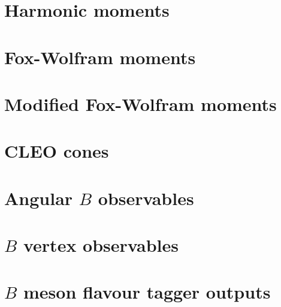 \section{Harmonic moments}\label{sec:harmonic_moments}

\newpage

\section{Fox-Wolfram moments}\label{sec:fox_wolfram_moments}

\newpage

\section{Modified Fox-Wolfram moments}\label{sec:modified_fox_wolfram_moments}

\newpage

\section{CLEO cones}\label{sec:cleo_cones}

\newpage

\section{Angular \texorpdfstring{$B$}{B} observables}\label{sec:angular_features}

\newpage

\section{\texorpdfstring{$B$}{B} vertex observables}\label{sec:vertex_features}

\newpage

\section{\texorpdfstring{$B$}{B} meson flavour tagger outputs}\label{sec:flavour_tagger_outputs}
